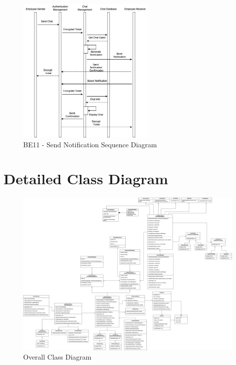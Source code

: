 \documentclass[]{article}
\begin{document}
\begin{figure}[H]
	\centering
	\includegraphics[width=0.6\textwidth]{BE11.png}
	\caption{BE11 - Send Notification Sequence Diagram}
\end{figure}

\section{Detailed Class Diagram}
\label{sec:detailed_class_diagram}
\renewcommand{\thefigure}{4.\arabic{figure}}
\setcounter{figure}{0}
\begin{figure}[H]
	\centering
	\includegraphics[scale=0.18]{class-diagram.jpg}
	\caption{Overall Class Diagram}
	\label{fig:class-diagram}
\end{figure}
\end{document}
